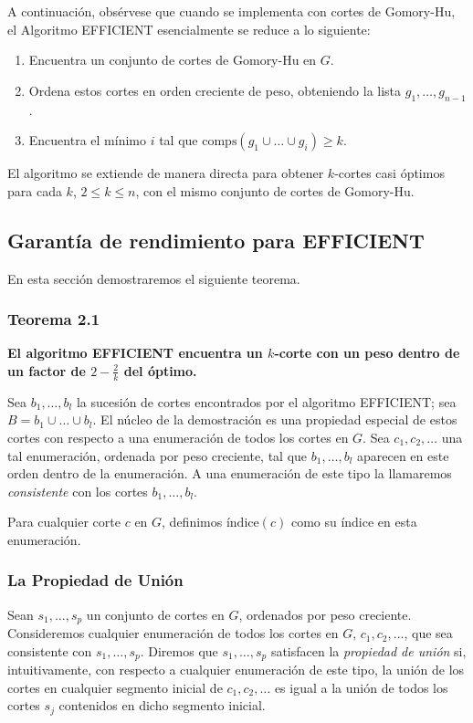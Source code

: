 \documentclass[a4paper, 12pt]{article}
\begin{document}
A continuación, obsérvese que cuando se implementa con cortes de Gomory-Hu, el Algoritmo \textsc{EFFICIENT} esencialmente se reduce a lo siguiente:

\begin{enumerate}
    \item Encuentra un conjunto de cortes de Gomory-Hu en $G$.
    \item Ordena estos cortes en orden creciente de peso, obteniendo la lista $g_1, \dots, g_{n-1}$.
    \item Encuentra el mínimo $i$ tal que $\text{comps}(g_1 \cup \dots \cup g_i) \geq k$.
\end{enumerate}

El algoritmo se extiende de manera directa para obtener $k$-cortes casi óptimos para cada $k$, $2 \leq k \leq n$, con el mismo conjunto de cortes de Gomory-Hu.

\subsection{Garantía de rendimiento para EFFICIENT}

En esta sección demostraremos el siguiente teorema.

\subsubsection*{Teorema 2.1}
\textbf{El algoritmo EFFICIENT encuentra un \( k \)-corte con un peso dentro de un factor de \( 2 - \frac{2}{k} \) del óptimo.}

Sea \( b_1, \dots, b_l \) la sucesión de cortes encontrados por el algoritmo EFFICIENT; sea \( B = b_1 \cup \dots \cup b_l \).  
El núcleo de la demostración es una propiedad especial de estos cortes con respecto a una enumeración de todos los cortes en \( G \). Sea \( c_1, c_2, \dots \) una tal enumeración, ordenada por peso creciente, tal que \( b_1, \dots, b_l \) aparecen en este orden dentro de la enumeración. A una enumeración de este tipo la llamaremos \emph{consistente} con los cortes \( b_1, \dots, b_l \).  

Para cualquier corte \( c \) en \( G \), definimos \( \text{índice}(c) \) como su índice en esta enumeración.

\subsubsection*{La Propiedad de Unión}
Sean \( s_1, \dots, s_p \) un conjunto de cortes en \( G \), ordenados por peso creciente. Consideremos cualquier enumeración de todos los cortes en \( G \), \( c_1, c_2, \dots \), que sea consistente con \( s_1, \dots, s_p \). Diremos que \( s_1, \dots, s_p \) satisfacen la \emph{propiedad de unión} si, intuitivamente, con respecto a cualquier enumeración de este tipo, la unión de los cortes en cualquier segmento inicial de \( c_1, c_2, \dots \) es igual a la unión de todos los cortes \( s_j \) contenidos en dicho segmento inicial.  
\end{document}
